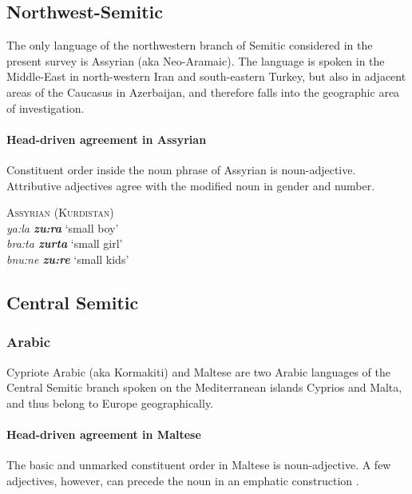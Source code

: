 \subsection{Northwest-Semitic}
The only language of the northwestern branch of Semitic considered in the present survey is Assyrian (aka Neo-Aramaic). The language is spoken in the Middle-East in north-western Iran and south-eastern Turkey, but also in adjacent areas of the Caucasus in Azerbaijan, and therefore falls into the geographic area of investigation.

\paragraph{Head-driven agreement in Assyrian}
Constituent order inside the noun phrase of Assyrian is noun-adjective. Attributive adjectives agree with the modified noun in gender and number.
\begin{exe}
\ex \textsc{Assyrian (Kurdistan)} \citep{krotkoff1982}\\
\textit{ya:la \textbf{zu:ra}} ‘small boy’\\
\textit{bra:ta \textbf{zurta}} ‘small girl’\\
\textit{bnu:ne \textbf{zu:re}} ‘small kids’
\end{exe}

\subsection{Central Semitic}		
\subsubsection{Arabic}
Cypriote Arabic (aka Kormakiti) and Maltese are two Arabic languages of the Central Semitic branch spoken on the Mediterranean islands Cyprios and Malta, and thus belong to Europe geographically.

\paragraph{Head-driven agreement in Maltese}
The basic and unmarked constituent order in Maltese is noun-adjective. A few adjectives, however, can precede the noun in an emphatic construction \citep[71]{borg-etal1996}.

